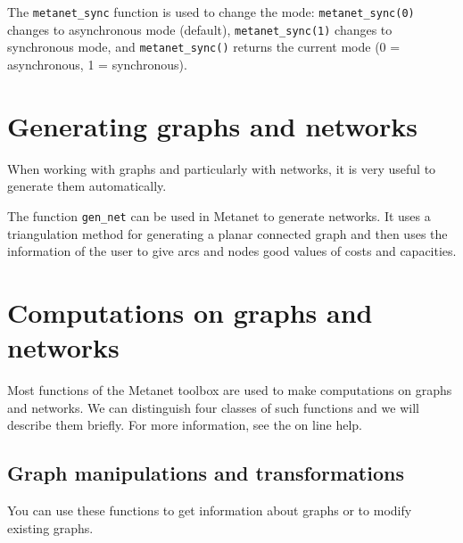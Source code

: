 \documentclass[11pt]{article}
\newcommand{\func}[1]{\texttt{#1}}
\begin{document}
The \func{metanet\_sync} function is used to change the mode:
\texttt{metanet\_sync(0)} changes to asynchronous mode (default),
\texttt{metanet\_sync(1)} changes to synchronous mode, and
\texttt{metanet\_sync()} returns the current mode (0 = asynchronous,
1 = synchronous).

\section{Generating graphs and networks}\label{generation}

When working with graphs and particularly with networks, it is very
useful to generate them automatically.

The function \func{gen\_net} can be used in Metanet to generate
networks. It uses a triangulation method for generating a planar
connected graph and then uses the information of the user to give arcs
and nodes good values of costs and capacities.

\section{Computations on graphs and networks}

Most functions of the Metanet toolbox are used to make computations on
graphs and networks. We can distinguish four classes of such functions and
we will describe them briefly. For more information, see the on line
help.

\subsection{Graph manipulations and transformations}

You can use these functions to get information about graphs or to
modify existing graphs.
\end{document}
